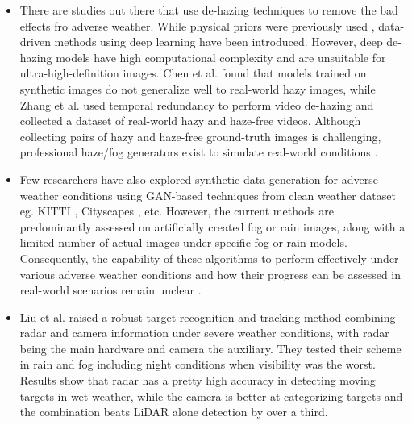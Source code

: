 \documentclass[rnd]{mas_proposal}
\begin{document}
\begin{itemize}
      
      \item There are studies out there that use de-hazing techniques to remove the bad effects fro adverse weather. While physical priors were previously used \cite{tan2008visibility} \cite{tarel2009fast}, data-driven methods using deep learning have been introduced. However, deep de-hazing models have high computational complexity and are unsuitable for ultra-high-definition images. Chen et al. \cite{chen2021psd} found that models trained on synthetic images do not generalize well to real-world hazy images, while Zhang et al. \cite{zhang2021learning} used temporal redundancy to perform video de-hazing and collected a dataset of real-world hazy and haze-free videos. Although collecting pairs of hazy and haze-free ground-truth images is challenging, professional haze/fog generators exist to simulate real-world conditions \cite{musat2021multi} \cite{timofte2018ntire}.

      \item Few researchers \cite{sun2021multi} \cite{zheng2020forkgan} \cite{lee2022perception} have also explored synthetic data generation for adverse weather conditions using GAN-based techniques from clean weather dataset eg. KITTI \cite{geiger2012we}, Cityscapes \cite{cordts2016cityscapes}, etc. However, the current methods are predominantly assessed on artificially created fog or rain images, along with a limited number of actual images under specific fog or rain models. Consequently, the capability of these algorithms to perform effectively under various adverse weather conditions and how their progress can be assessed in real-world scenarios remain unclear \cite{hassaballah2020vehicle}.
      
      \item Liu et al. \cite{liu2021robust} raised a robust target recognition and tracking method combining radar and camera information under severe weather conditions, with radar being the main hardware and camera the auxiliary. They tested their scheme in rain and fog including night conditions when visibility was the worst. Results show that radar has a pretty high accuracy in detecting moving targets in wet weather, while the camera is better at categorizing targets and the combination beats LiDAR alone detection by over a third.


\end{itemize}
\end{document}
